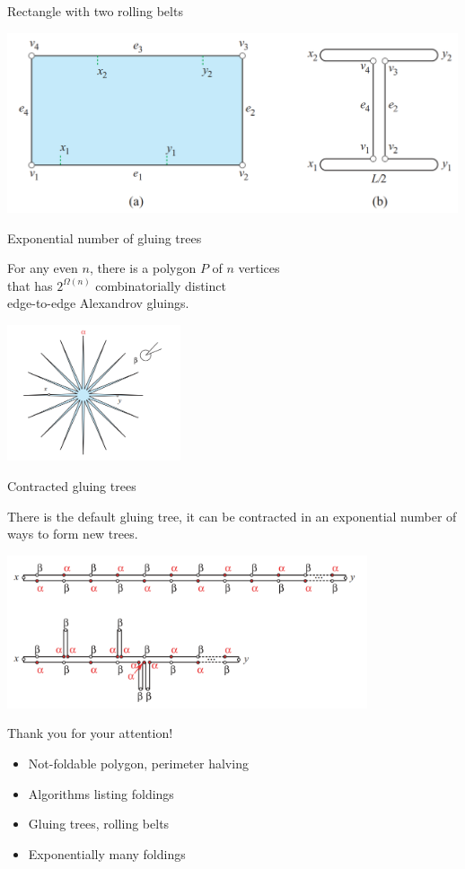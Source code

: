 \documentclass[17pt]{extarticle}
\newcommand{\newslide}[1]{\newpage \begin{center} \large #1
                          \end{center} \vspace{-5.5mm}}
\begin{document}
\newslide{Rectangle with two rolling belts}

\begin{center}
	\includegraphics[height=5.3cm]{minilec/rectrb}
\end{center}

\newslide{Exponential number of gluing trees} \vspace{-2mm}

For any even \(n\), there is a polygon \(P\) of \(n\) vertices \\
that has \(2^{Ω(n)}\) combinatorially distinct \\
edge-to-edge Alexandrov gluings. \vspace{-2mm}

\begin{center}
	\includegraphics[width=5.1cm]{minilec/stargt}
\end{center}

\newslide{Contracted gluing trees}

There is the default gluing tree, it can be contracted in an exponential number of ways to form new trees.

\begin{center}
	\includegraphics[height=4.5cm]{minilec/stargtcontract}
\end{center}

\newslide{Thank you for your attention!}

\begin{itemize}
	\item Not-foldable polygon, perimeter halving
	\item Algorithms listing foldings
	\item Gluing trees, rolling belts
	\item Exponentially many foldings
\end{itemize}
\end{document}
